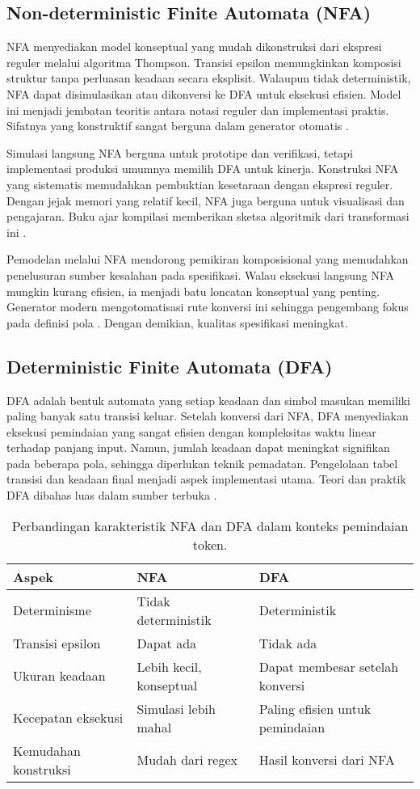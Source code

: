 \documentclass[../main.tex]{subfiles}
\begin{document}
\subsection{Non-deterministic Finite Automata (NFA)}
NFA menyediakan model konseptual yang mudah dikonstruksi dari ekspresi reguler melalui algoritma Thompson. Transisi epsilon memungkinkan komposisi struktur tanpa perluasan keadaan secara eksplisit. Walaupun tidak deterministik, NFA dapat disimulasikan atau dikonversi ke DFA untuk eksekusi efisien. Model ini menjadi jembatan teoritis antara notasi reguler dan implementasi praktis. Sifatnya yang konstruktif sangat berguna dalam generator otomatis \citep{WikiNFA}.

Simulasi langsung NFA berguna untuk prototipe dan verifikasi, tetapi implementasi produksi umumnya memilih DFA untuk kinerja. Konstruksi NFA yang sistematis memudahkan pembuktian kesetaraan dengan ekspresi reguler. Dengan jejak memori yang relatif kecil, NFA juga berguna untuk visualisasi dan pengajaran. Buku ajar kompilasi memberikan sketsa algoritmik dari transformasi ini \citep{Mogensen2010}.

Pemodelan melalui NFA mendorong pemikiran komposisional yang memudahkan penelusuran sumber kesalahan pada spesifikasi. Walau eksekusi langsung NFA mungkin kurang efisien, ia menjadi batu loncatan konseptual yang penting. Generator modern mengotomatisasi rute konversi ini sehingga pengembang fokus pada definisi pola \citep{WikiNFA}. Dengan demikian, kualitas spesifikasi meningkat.

\subsection{Deterministic Finite Automata (DFA)}
DFA adalah bentuk automata yang setiap keadaan dan simbol masukan memiliki paling banyak satu transisi keluar. Setelah konversi dari NFA, DFA menyediakan eksekusi pemindaian yang sangat efisien dengan kompleksitas waktu linear terhadap panjang input. Namun, jumlah keadaan dapat meningkat signifikan pada beberapa pola, sehingga diperlukan teknik pemadatan. Pengelolaan tabel transisi dan keadaan final menjadi aspek implementasi utama. Teori dan praktik DFA dibahas luas dalam sumber terbuka \citep{WikiDFA}.

\begin{table}[t]
  \centering
  \caption{Perbandingan karakteristik NFA dan DFA dalam konteks pemindaian token.}
  \label{tab:nfa-dfa}
  \begin{tabular}{@{}lll@{}}
    \toprule
    Aspek & NFA & DFA \\
    \midrule
    Determinisme & Tidak deterministik & Deterministik \\
    Transisi epsilon & Dapat ada & Tidak ada \\
    Ukuran keadaan & Lebih kecil, konseptual & Dapat membesar setelah konversi \\
    Kecepatan eksekusi & Simulasi lebih mahal & Paling efisien untuk pemindaian \\
    Kemudahan konstruksi & Mudah dari regex & Hasil konversi dari NFA \\
    \bottomrule
  \end{tabular}
\end{table}
\end{document}
